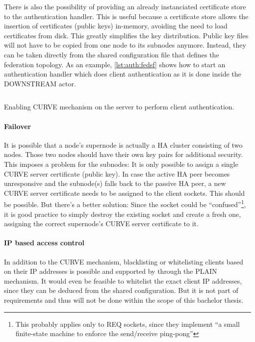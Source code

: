 There is also the possibility of providing an already instanciated certificate
store to the authentication handler. This is useful because a certificate store
allows the insertion of certificates (public keys) in-memory, avoiding the need
to load certificates from disk. This greatly simplifies the key distribution.
Public key files will not have to be copied from one node to its subnodes
anymore. Instead, they can be taken directly from the shared configuration file
that defines the federation topology. As an example, \autoref{lst:auth:fedsf}
shows how to start an authentication handler which does client authentication
as it is done inside the DOWNSTREAM actor.

\begin{listing}
	\inputminted[bgcolor=bg]{Ruby}{listings/auth/fedsf.rb}
	\caption{Enabling CURVE mechanism on the server to perform client authentication.}
	\label{lst:auth:fedsf}
\end{listing}

\paragraph{Failover}\label{sec:approach:encryption:ha}
It is possible that a node's supernode is actually a HA cluster consisting of
two nodes. Those two nodes should have their own key pairs for additional
security. This imposes a problem for the subnodes: It is only possible to assign
a single CURVE server certificate (public key). In case the active HA peer becomes
unresponsive and the subnode(s) falls back to the passive HA peer, a new CURVE
server certificate needs to be assigned to the client sockets. This should be
possible. But there's a better solution:
Since the socket could be \cite[Binary Star Implementation, Binary Star client
in C]{zmq:zguide} ``confused''\footnote{This probably applies only to REQ
sockets, since they implement \cite[Client-Side Reliability (Lazy Pirate
Pattern)]{zmq:zguide} ``a small finite-state machine to enforce the
send/receive ping-pong''}, it is good practice to simply destroy the existing
socket and create a fresh one, assigning the correct supernode's CURVE server
certificate to it.

\paragraph{IP based access control}
In addition to the CURVE mechanism, blacklisting or whitelisting clients based
on their \gls{IP} addresses is possible and supported by
 through the PLAIN mechanism. It would even be
feasible to whitelist the exact client IP addresses, since they can be deduced
from the shared configuration. But it is not part of requirements and thus will not
be done within the scope of this bachelor thesis.

